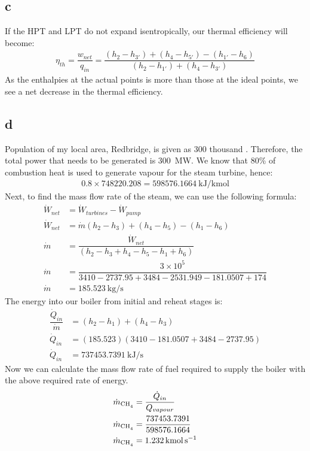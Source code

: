 \documentclass[11pt]{article}
\numberwithin{equation}{section}
\begin{document}
\subsection{c}
If the HPT and LPT do not expand isentropically, our thermal efficiency will become:
\begin{align}
    \eta_{th} = \dfrac{w_{net}}{q_{in}} = \dfrac{\left(h_2 - h_{3'}\right) + \left(h_4 - h_{5'}\right) - \left(h_{1'} - h_6\right)}{\left(h_2 - h_{1'}\right) + \left(h_4 - h_{3'}\right)}
\end{align}
As the enthalpies at the actual points is more than those at the ideal points, we see a net decrease in the thermal efficiency.
\subsection{d}
Population of my local area, Redbridge, is given as 300 thousand \cite{b2}. Therefore, the total power that needs to be generated is \SI{300}{\mega\watt}.
We know that 80\% of combustion heat is used to generate vapour for the steam turbine, hence:
\begin{align}
    0.8 \times 748220.208 = \SI{598576.1664}{\kilo\joule\per\kilo\mol }
\end{align}
Next, to find the mass flow rate of the steam, we can use the following formula:
\begin{align}
    \dot{W}_{net} &= \dot{W}_{turbines} - \dot{W}_{pump}\\
    \dot{W}_{net} &= \dot{m} \left(h_2 - h_3\right) + \left(h_4 - h_5\right) - \left(h_1 - h_6\right)\\
    \dot{m} &= \dfrac{\dot{W}_{net}}{\left(h_2 - h_3 + h_4 - h_5 - h_1 + h_6\right)}\\
    \dot{m} &= \dfrac{3\times 10^5}{3410-2737.95+3484-2531.949-181.0507+174}\\
    \dot{m} &= \SI{185.523}{\kg\per\s} \label{eq:q5d1}
\end{align}
The energy into our boiler from initial and reheat stages is:
\begin{align}
    \dfrac{\dot{Q}_{in}}{\dot{m}} &= \left(h_2 - h_1\right) + \left(h_4 - h_3\right)\\
    \dot{Q}_{in} &= \left(185.523\right)\left(3410 -181.0507+3484-2737.95\right)\\
    \dot{Q}_{in} &= \SI{737453.7391}{\kilo\joule\per\second}
\end{align}
Now we can calculate the mass flow rate of fuel required to supply the boiler with the above required rate of energy.
\begin{align}
    \dot{m}_{\ce{CH4}} &= \dfrac{\dot{Q}_{in}}{Q_{vapour}}\\
    \dot{m}_{\ce{CH4}} &= \dfrac{737453.7391}{598576.1664}\\
    \dot{m}_{\ce{CH4}} &= \SI{1.232}{\kilo\mol\per\second}
\end{align}
\end{document}
